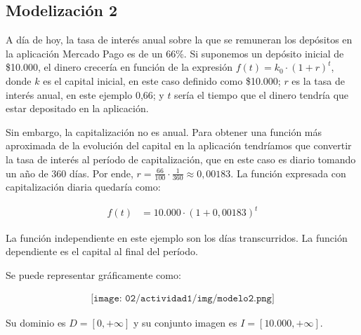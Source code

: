 \subsection*{Modelización 2}

A día de hoy, la tasa de interés anual sobre la que se remuneran los depósitos en la aplicación Mercado Pago es de un 66\%. Si suponemos un depósito inicial de \$10.000, el dinero crecería en función de la expresión $f(t) = k_0 \cdot (1 + r)^t$, donde $k$ es el capital inicial, en este caso definido como \$10.000; $r$ es la tasa de interés anual, en este ejemplo 0,66; y $t$ sería el tiempo que el dinero tendría que estar depositado en la aplicación. 

Sin embargo, la capitalización no es anual. Para obtener una función más aproximada de la evolución del capital en la aplicación tendríamos que convertir la tasa de interés al período de capitalización, que en este caso es diario tomando un año de 360 días. Por ende, $r = \frac{66}{100} \cdot \frac{1}{360} \approx 0,00183$. La función expresada con capitalización diaria quedaría como:

\begin{align*}
	f(t) &= 10.000 \cdot (1 + 0,00183)^t
\end{align*}

La función independiente en este ejemplo son los días transcurridos. La función dependiente es el capital al final del período.

Se puede representar gráficamente como:

\begin{align*}
	\texttt{[image: 02/actividad1/img/modelo2.png]}
\end{align*}

Su dominio es $D = [0,+\infty]$ y su conjunto imagen es $I = [10.000, +\infty]$.
